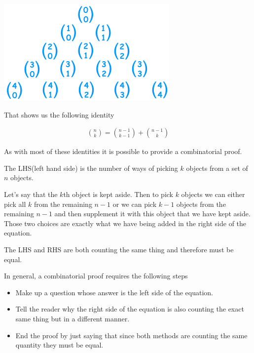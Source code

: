 \documentclass[12pt]{article}
\begin{document}
\includegraphics[scale=0.6]{pascalCombi.png}

That shows us the following identity 

\begin{align*}
\binom{n}{k} = \binom{n-1}{k-1} + \binom{n-1}{k}
\end{align*}

As with most of these identities it is possible to provide a combinatorial proof.

The LHS(left hand side) is the number of ways of picking $k$ objects from a set of $n$ objects.

Let's say that the $k$th object is kept aside. Then to pick $k$ objects we can either pick all $k$ from the remaining $n-1$ or we can pick $k-1$ objects from the remaining $n-1$ and then supplement it with this object that we have kept aside. Those two choices are exactly what we have being added in the right side of the equation. 

The LHS and RHS are both counting the same thing and therefore must be equal.

In general, a combinatorial proof requires the following steps

\begin{itemize}
\item Make up a question whose answer is the left side of the equation.
\item Tell the reader why the right side of the equation is also counting the exact same thing but in a different manner.
\item End the proof by just saying that since both methods are counting the same quantity they must be equal.
\end{itemize}
\end{document}
